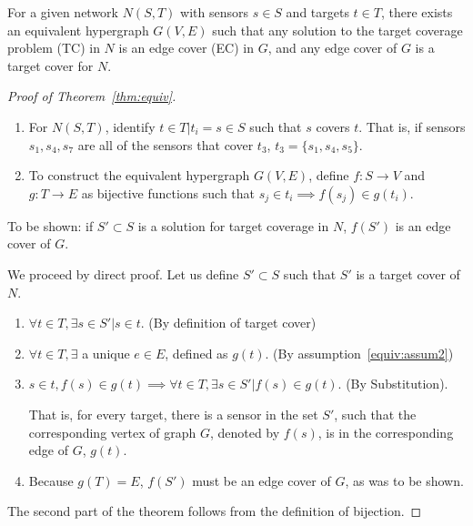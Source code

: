 \begin{thm}
  For a given network $N(S,T)$ with sensors $s\in S$ and targets $t\in T$, there exists an equivalent hypergraph $G(V,E)$ such that any solution to the target coverage problem (TC) in $N$ is an edge cover (EC) in $G$, and any edge cover of $G$ is a target cover for $N$.
\label{thm:equiv}
\end{thm}
\begin{proof}[Proof of Theorem~\ref{thm:equiv}]
\begin{enumerate}
\item For $N(S,T)$, identify $t \in T | t_i = s \in S $ such that $s$ covers $t$. That is, if sensors $s_1, s_4, s_7$ are all of the sensors that cover $t_3$, $t_3 = \{s_1, s_4, s_5\}$. \label{equiv:assum1}
\item To construct the equivalent hypergraph $G(V,E)$, define $f:S\to V$ and $g:T\to E$ as bijective functions such that $ s_j \in t_i \implies f(s_j) \in g(t_i)$. \label{equiv:assum2}
\end{enumerate}

To be shown: if $S' \subset S$ is a solution for target coverage in $N$, $f(S')$ is an edge cover of $G$. 

We proceed by direct proof. Let us define $S'\subset S$ such that $S'$ is a target cover of $N$. 

\begin{enumerate}
\item $\forall t \in T, \exists s \in S' | s \in t$. (By definition of target cover)
\item $\forall t \in T, \exists $ a unique $e \in E$, defined as $g(t)$. (By assumption~\ref{equiv:assum2})
\item $s \in t, f(s) \in g(t) \implies \forall t \in T, \exists s \in S' | f(s) \in g(t)$. (By Substitution). 

That is, for every target, there is a sensor in the set $S'$, such that the corresponding vertex of graph $G$, denoted by $f(s)$, is in the corresponding edge of $G$, $g(t)$. 
\item Because $g(T) = E$, $f(S')$ must be an edge cover of $G$, as was to be shown.
\end{enumerate}
The second part of the theorem follows from the definition of bijection. 
\end{proof}

